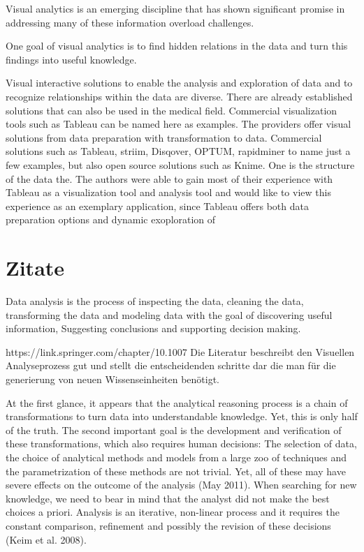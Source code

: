 Visual analytics is an emerging discipline that has shown significant promise in addressing many of these information overload challenges.

One goal of visual analytics is to find hidden relations in the data and turn this findings into useful knowledge.

Visual interactive solutions to enable the analysis and exploration of data and to recognize relationships within the data are diverse. There are already established solutions that can also be used in the medical field. Commercial visualization tools such as Tableau can be named here as examples. The providers offer visual solutions from data preparation with transformation to data. Commercial solutions such as Tableau, striim, Disqover, OPTUM, rapidminer to name just a few examples, but also open source solutions such as Knime. One is the structure of the data the. The authors were able to gain most of their experience with Tableau as a visualization tool and analysis tool and would like to view this experience as an exemplary application, since Tableau offers both data preparation options and dynamic exoploration of



\section{Zitate}

Data analysis is the process of inspecting the data, cleaning the data, transforming the data and modeling data with the goal of discovering useful information, Suggesting conclusions and supporting decision making. 

https://link.springer.com/chapter/10.1007%
Die Literatur beschreibt den Visuellen Analyseprozess gut und stellt die entscheidenden schritte dar die man für die generierung von neuen Wissenseinheiten benötigt.

At the first glance, it appears that the analytical reasoning process is a chain of transformations to turn data into understandable knowledge. Yet, this is only half of the truth. The second important goal is the development and verification of these transformations, which also requires human decisions: The selection of data, the choice of analytical methods and models from a large zoo of techniques and the parametrization of these methods are not trivial. Yet, all of these may have severe effects on the outcome of the analysis (May 2011). When searching for new knowledge, we need to bear in mind that the analyst did not make the best choices a priori. Analysis is an iterative, non-linear process and it requires the constant comparison, refinement and possibly the revision of these decisions (Keim et al. 2008).

